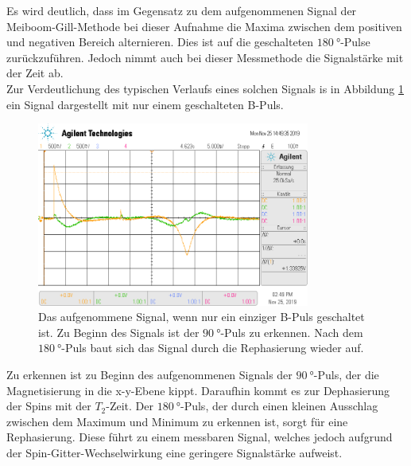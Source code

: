 Es wird deutlich, dass im Gegensatz zu dem aufgenommenen Signal der Meiboom-Gill-Methode bei dieser Aufnahme die Maxima zwischen
dem positiven und negativen Bereich alternieren. Dies ist auf die geschalteten $\SI{180}{\degree}$-Pulse zurückzuführen. Jedoch
nimmt auch bei dieser Messmethode die Signalstärke mit der Zeit ab. \\
Zur Verdeutlichung des typischen Verlaufs eines solchen Signals is in Abbildung \ref{fig:N1} ein Signal dargestellt mit nur einem
geschalteten B-Puls.
\begin{figure}[H]
  \centering
  \includegraphics[width=0.8\textwidth]{../data/scope_77.png}
  \caption{Das aufgenommene Signal, wenn nur ein einziger B-Puls geschaltet ist. Zu Beginn des Signals ist der 
  $\SI{90}{\degree}$-Puls zu erkennen. Nach dem $\SI{180}{\degree}$-Puls baut sich das Signal durch die Rephasierung 
  wieder auf.}
  \label{fig:N1}
\end{figure} \noindent
Zu erkennen ist zu Beginn des aufgenommenen Signals der $\SI{90}{\degree}$-Puls, der die Magnetisierung in die x-y-Ebene kippt.
Daraufhin kommt es zur Dephasierung der Spins mit der $T_2$-Zeit. Der $\SI{180}{\degree}$-Puls, der durch einen kleinen Ausschlag
zwischen dem Maximum und Minimum zu erkennen ist, sorgt für eine Rephasierung. Diese führt zu einem messbaren Signal, welches 
jedoch aufgrund der Spin-Gitter-Wechselwirkung eine geringere Signalstärke aufweist.

